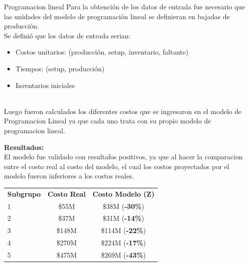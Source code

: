 \documentclass{beamer}
\begin{document}
\begin{frame}{Programacion lineal}
\footnotesize
  Para la obtención de los datos de entrada fue necesario que las unidades del modelo de programación lineal se definieran en bajadas de producción.\\
  Se definió que los datos de entrada serian:
\begin{itemize}
  \item Costos unitarios: (producci\'on, setup, inventario, faltante)
  \item Tiempos: (setup, producci\'on)
  \item Inventarios iniciales
\end{itemize}
\textbf{ } \\
  Luego fueron calculados los diferentes costos que se ingresaron en el modelo de Programacion Lineal ya que cada uno trata con su propio modelo de programacion lineal.

\textbf{Resultados: } \\
El modelo fue validado con resultafos positivos, ya que al hacer la comparacion entre el costo real al costo del modelo, el cual los costos proyectados por el modelo fueron inferiores a los costos reales. \\
\begin{tabular}{lcc}\\
\textbf{Subgrupo} & \textbf{Costo Real} & \textbf{Costo Modelo (Z)} \\
1 & \$55M & \$38M (\textbf{-30\%}) \\
2 & \$37M & \$31M (\textbf{-14\%}) \\
3 & \$148M & \$114M (\textbf{-22\%}) \\
4 & \$270M & \$224M (\textbf{-17\%}) \\
5 & \$475M & \$269M (\textbf{-43\%}) \\
\end{tabular}
\end{frame}
\end{document}
